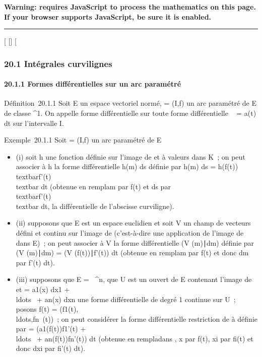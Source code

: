 \textbf{Warning: 
requires JavaScript to process the mathematics on this page.\\ If your
browser supports JavaScript, be sure it is enabled.}

\begin{center}\rule{3in}{0.4pt}\end{center}

{[}
{[}{]}
{[}

\subsubsection{20.1 Intégrales curvilignes}

\paragraph{20.1.1 Formes différentielles sur un arc paramétré}

Définition~20.1.1 Soit E un espace vectoriel normé, \Gamma = (I,f) un arc
paramétré de E de classe ^1. On appelle forme différentielle
sur \Gamma toute forme différentielle \alpha~ = a(t) dt sur l'intervalle I.

Exemple~20.1.1 Soit \Gamma = (I,f) un arc paramétré de E

\begin{itemize}
\itemsep1pt\parskip0pt
\item
  (i) soit h une fonction définie sur l'image de \Gamma et à valeurs dans K~;
  on peut associer à h la forme différentielle h(m) ds définie par h(m)
  ds = h(f(t)) \\textbar{}f'(t)\\textbar{}
  dt (obtenue en rempla\ccant m par f(t) et ds par
  \\textbar{}f'(t)\\textbar{} dt, la
  différentielle de l'abscisse curviligne).
\item
  (ii) supposons que E est un espace euclidien et soit V un champ de
  vecteurs défini et continu sur l'image de \Gamma (c'est-à-dire une
  application de l'image de \Gamma dans E)~; on peut associer à V la forme
  différentielle (V (m)∣dm) définie par (V
  (m)∣dm) = \left (V
  (f(t))∣f'(t)\right ) dt
  (obtenue en rempla\ccant m par f(t) et donc dm par
  f'(t) dt).
\item
  (iii) supposons que E = ~^n, que U est un ouvert de E
  contenant l'image de \Gamma et \omega = a1(x) dx1 +
  \\ldots~ +
  an(x) dxn une forme différentielle de degré 1
  continue sur U~; posons f(t) =
  (f1(t),\\ldots,fn~(t))~;
  on peut considérer la forme différentielle restriction de \omega à \Gamma
  définie par \omega\textbar{}\Gamma = \left
  (a1(f(t))f1'(t) +
  \\ldots~ +
  an(f(t))fn'(t)\right ) dt (obtenue
  en rempla\ccant dans \omega, x par f(t), xi
  par fi(t) et donc dxi par fi'(t) dt).
\end{itemize}


